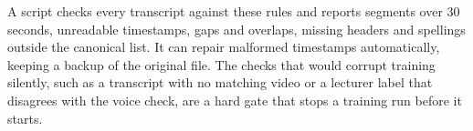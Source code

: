 A script checks every transcript against these rules and reports segments over 30 seconds,
unreadable timestamps, gaps and overlaps, missing headers and spellings outside the
canonical list. It can repair malformed timestamps automatically, keeping a backup of the
original file. The checks that would corrupt training silently, such as a transcript with
no matching video or a lecturer label that disagrees with the voice check, are a hard gate
that stops a training run before it starts.
